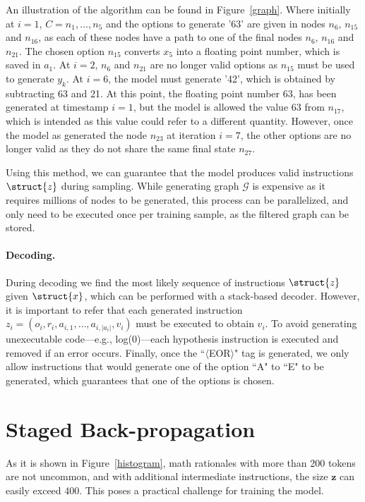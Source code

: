 {An illustration of the algorithm can be found in Figure~\ref{graph}. Where initially at $i=1$, $C=n_1,\ldots,n_5$ and the options to generate '63' are given in nodes $n_6$, $n_{15}$ and $n_{16}$, as each of these nodes have a path to one of the final nodes $n_6$, $n_{16}$ and $n_{21}$. The chosen option $n_{15}$ converts $x_5$ into a floating point number, which is saved in $a_1$. At $i=2$, $n_6$ and $n_21$ are no longer valid options as $n_{15}$ must be used to generate $y_k$. At $i=6$, the model must generate '42', which is obtained by subtracting 63 and 21. At this point, the floating point number 63, has been generated at timestamp $i=1$, but the model is allowed the value 63 from $n_{17}$, which is intended as this value could refer to a different quantity. However, once the model as generated the node $n_{23}$ at iteration $i=7$, the other options are no longer valid as they do not share the same final state $n_{27}$.

Using this method, we can guarantee that the model produces valid instructions $\struct{z}$ during sampling. While generating graph $\mathcal{G}$ is expensive as it requires millions of nodes to be generated, this process can be parallelized, and only need to be executed once per training sample, as the filtered graph can be stored.
}
\paragraph{Decoding.}
During decoding we find the most likely sequence of instructions $\struct{z}$ given $\struct{x}$, which can be performed with a stack-based decoder. However, it is important to refer that each generated instruction $z_i=(o_i,r_i,a_{i,1},\ldots,a_{i,|a_{i}|},v_i)$ must be executed to obtain $v_i$. To avoid generating unexecutable code---e.g., log(0)---each hypothesis instruction is executed and removed if an error occurs. Finally, once the ``$\langle$EOR$\rangle$" tag is generated, we only allow instructions that would generate one of the option ``A" to ``E" to be generated, which guarantees that one of the options is chosen.

\section{Staged Back-propagation}
As it is shown in Figure~\ref{histogram}, math rationales with more than 200 tokens are not uncommon, and with additional intermediate instructions, the size $\boldsymbol{z}$ can easily exceed 400. This poses a practical challenge for training the model.

